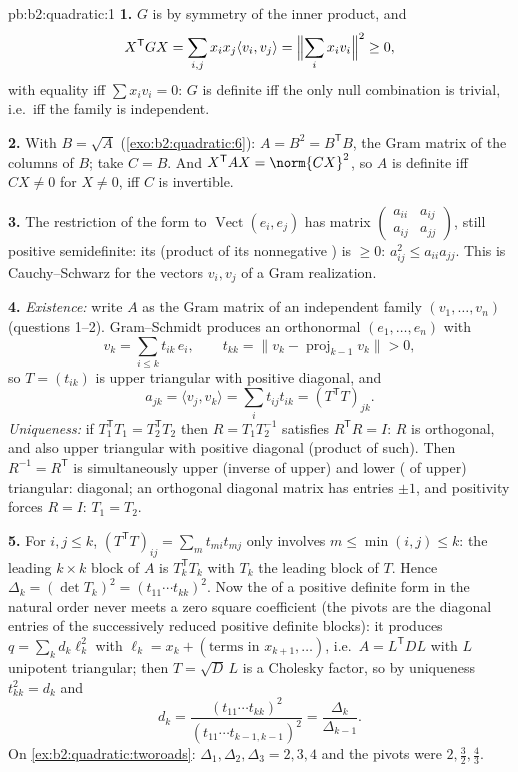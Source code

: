 \begin{solution}{pb:b2:quadratic:1}
\textbf{1.} $G$ is  by symmetry of the inner product,
and
\[
X^{\mathsf T}GX = \sum_{i,j}x_ix_j\langle v_i, v_j\rangle
= \Bigl\|\sum_i x_iv_i\Bigr\|^2 \geq 0 ,
\]
with equality iff $\sum x_iv_i = 0$: $G$ is definite iff the
only null combination is trivial, i.e.\ iff the family is
independent.

\textbf{2.} With $B = \sqrt A$ (\cref{exo:b2:quadratic:6}): $A
= B^2 = B^{\mathsf T}B$, the Gram matrix of the columns of $B$;
take $C = B$. And $X^{\mathsf T}AX = \norm{CX}^2$, so $A$ is
definite iff $CX \neq 0$ for $X \neq 0$, iff $C$ is invertible.

\textbf{3.} The restriction of the form to
$\operatorname{Vect}(e_i, e_j)$ has matrix
$\begin{pmatrix} a_{ii} & a_{ij}\\ a_{ij} & a_{jj}
\end{pmatrix}$, still positive semidefinite: its 
(product of its nonnegative ) is $\geq 0$:
$a_{ij}^2 \leq a_{ii}a_{jj}$. This is Cauchy--Schwarz for the
vectors $v_i, v_j$ of a Gram realization.

\textbf{4.} \emph{Existence:} write $A$ as the Gram matrix of
an independent family $(v_1, \dots, v_n)$ (questions 1--2).
Gram--Schmidt produces an orthonormal $(e_1, \dots, e_n)$ with
\[
v_k = \sum_{i \leq k} t_{ik}\,e_i,
\qquad t_{kk} = \bigl\| v_k - \operatorname{proj}_{k-1}v_k
\bigr\| > 0 ,
\]
so $T = (t_{ik})$ is upper triangular with positive diagonal,
and
\[
a_{jk} = \langle v_j, v_k\rangle
= \sum_i t_{ij}t_{ik} = (T^{\mathsf T}T)_{jk} .
\]
\emph{Uniqueness:} if $T_1^{\mathsf T}T_1 = T_2^{\mathsf T}T_2$
then $R = T_1T_2^{-1}$ satisfies $R^{\mathsf T}R = I$: $R$ is
orthogonal, and also upper triangular with positive diagonal
(product of such). Then $R^{-1} = R^{\mathsf T}$ is
simultaneously upper (inverse of upper) and lower ( of
upper) triangular: diagonal; an orthogonal diagonal matrix has
entries $\pm1$, and positivity forces $R = I$: $T_1 = T_2$.

\textbf{5.} For $i, j \leq k$, $(T^{\mathsf T}T)_{ij} = \sum_m
t_{mi}t_{mj}$ only involves $m \leq \min(i,j) \leq k$: the
leading $k\times k$ block of $A$ is $T_k^{\mathsf T}T_k$ with
$T_k$ the leading block of $T$. Hence $\Delta_k = (\det T_k)^2
= (t_{11}\cdots t_{kk})^2$. Now the  of a
positive definite form in the natural order never meets a zero
square coefficient (the pivots are the diagonal entries of the
successively reduced positive definite blocks): it produces $q
= \sum_k d_k\ell_k^2$ with $\ell_k = x_k + (\text{terms in }
x_{k+1}, \dots)$, i.e.\ $A = L^{\mathsf T}DL$ with $L$
unipotent triangular; then $T = \sqrt D\,L$ is a Cholesky
factor, so by uniqueness $t_{kk}^2 = d_k$ and
\[
d_k = \frac{(t_{11}\cdots t_{kk})^2}
{(t_{11}\cdots t_{k-1,k-1})^2}
= \frac{\Delta_k}{\Delta_{k-1}} .
\]
On \cref{ex:b2:quadratic:tworoads}: $\Delta_1, \Delta_2,
\Delta_3 = 2, 3, 4$ and the pivots were $2, \frac32, \frac43$.


\end{solution}
